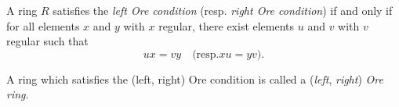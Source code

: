 \documentclass[12pt]{article}
\begin{document}
A ring $R$ satisfies the \emph{left Ore condition} (resp. \emph{right Ore condition}) if and only if for all elements $x$ and $y$ with $x$ regular, there exist elements $u$ and $v$ with $v$ regular such that
$$ux = vy \quad\text{(resp.} xu = yv\text{).}$$

A ring which satisfies the (left, right) Ore condition is called a (\emph{left}, \emph{right}) \emph{Ore ring}.
\end{document}
